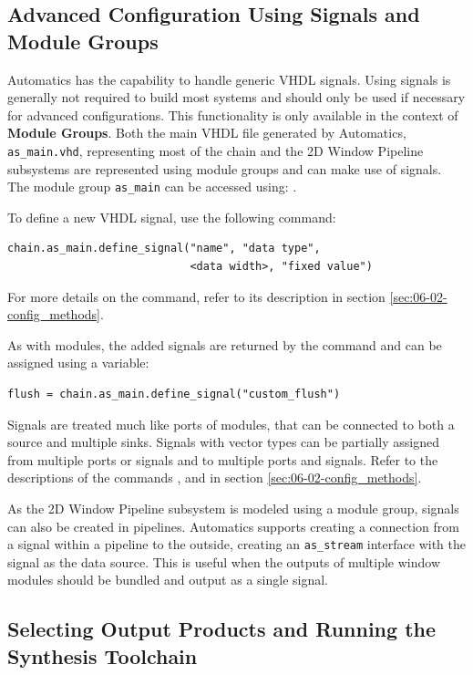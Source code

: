 \subsection{Advanced Configuration Using Signals and Module Groups}

Automatics has the capability to handle generic VHDL signals.
Using signals is generally not required to build most systems and should only be used if necessary for advanced configurations.
This functionality is only available in the context of \textbf{Module Groups}.
Both the main VHDL file generated by Automatics, \texttt{as\_main.vhd}, representing most of the \asterics chain and the 2D Window Pipeline subsystems are represented using module groups and can make use of signals.
The module group \texttt{as\_main} can be accessed using: .


To define a new VHDL signal, use the following command:
\begin{lstlisting}[style=AutomaticsPython]
chain.as_main.define_signal("name", "data type", 
                            <data width>, "fixed value")
\end{lstlisting}
For more details on the command, refer to its description in section \ref{sec:06-02-config_methods}.

As with modules, the added signals are returned by the command and can be assigned using a variable:
\begin{lstlisting}[style=AutomaticsPython]
flush = chain.as_main.define_signal("custom_flush")
\end{lstlisting}

Signals are treated much like ports of modules, that can be connected to both a source and multiple sinks.
Signals with vector types can be partially assigned from multiple ports or signals and to multiple ports and signals.
Refer to the descriptions of the commands ,  and  in section \ref{sec:06-02-config_methods}.

As the 2D Window Pipeline subsystem is modeled using a module group, signals can also be created in pipelines.
Automatics supports creating a connection from a signal within a pipeline to the outside, creating an \texttt{as\_stream} interface with the signal as the data source.
This is useful when the outputs of multiple window modules should be bundled and output as a single signal.


\subsection{Selecting Output Products and Running the Synthesis Toolchain}
\label{ssec:02-output}

